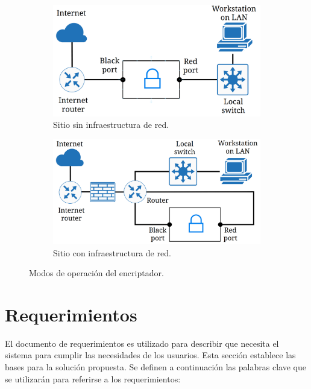 \begin{figure}[h!]
    \begin{subfigure}{0.45\textwidth}
        \centering
        \includegraphics[width=\textwidth]{../figs/1_small_node.png}
        \caption{Sitio sin infraestructura de red.}
        \label{fig:small_node}
    \end{subfigure}
    \hfill
    \begin{subfigure}{0.45\textwidth}
        \centering
        \includegraphics[width=\textwidth]{../figs/1_large_node.png}
        \caption{Sitio con infraestructura de red.}
        \label{fig:large_node}
    \end{subfigure}
    \caption{Modos de operación del encriptador.}
    \label{fig:modes_of_operation}
\end{figure}

\section{Requerimientos}
El documento de requerimientos es utilizado para describir que necesita el sistema para cumplir las necesidades de los usuarios. Esta sección establece las bases para la solución propuesta. Se definen a continuación las palabras clave que se utilizarán para referirse a los requerimientos:

